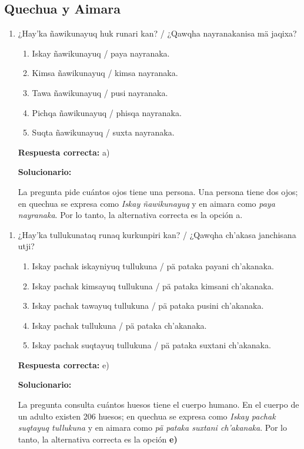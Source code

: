 \subsection*{Quechua y Aimara}

\begin{enumerate}[resume]
	
	\item ¿Hay'ka ñawikunayuq huk runari kan? / ¿Qawqha nayranakanisa mä jaqixa?
	
	\begin{enumerate}[label=\alph*)]
		\item Iskay ñawikunayuq / paya nayranaka.
		\item Kimsa ñawikunayuq / kimsa nayranaka.
		\item Tawa ñawikunayuq / pusi nayranaka.
		\item Pichqa ñawikunayuq / phisqa nayranaka.
		\item Suqta ñawikunayuq / suxta nayranaka.
	\end{enumerate}
	
	\textbf{Respuesta correcta:} a)
	
	\vspace{2mm}
	\textbf{Solucionario:}
	
	La pregunta pide cuántos ojos tiene una persona. Una persona tiene dos ojos; en quechua se expresa como \textit{Iskay ñawikunayuq} y en aimara como \textit{paya nayranaka}. Por lo tanto, la alternativa correcta es la opción a.
	
\end{enumerate}

\begin{enumerate}[resume]
	
	\item ¿Hay'ka tullukunataq runaq kurkunpiri kan? / ¿Qawqha ch'akasa janchisana utji?
	
	\begin{enumerate}[label=\alph*)]
		\item Iskay pachak iskayniyuq tullukuna / pä pataka payani ch'akanaka.
		\item Iskay pachak kimsayuq tullukuna / pä pataka kimsani ch'akanaka.
		\item Iskay pachak tawayuq tullukuna / pä pataka pusini ch'akanaka.
		\item Iskay pachak tullukuna / pä pataka ch'akanaka.
		\item Iskay pachak suqtayuq tullukuna / pä pataka suxtani ch'akanaka.
	\end{enumerate}
	
	\textbf{Respuesta correcta:} e)
	
	\vspace{2mm}
	\textbf{Solucionario:}
	
	La pregunta consulta cuántos huesos tiene el cuerpo humano. En el cuerpo de un adulto existen 206 huesos; en quechua se expresa como \textit{Iskay pachak suqtayuq tullukuna} y en aimara como \textit{pä pataka suxtani ch'akanaka}. Por lo tanto, la alternativa correcta es la opción \textbf{e)}
	
\end{enumerate}
	




